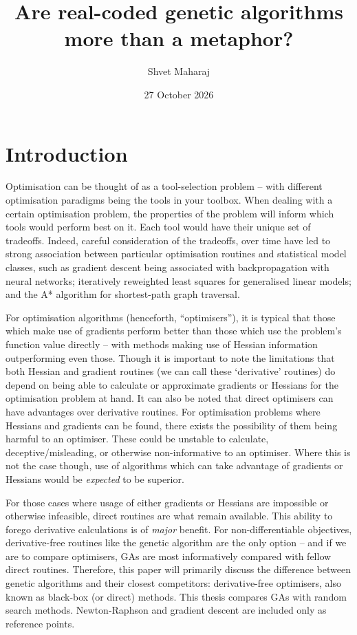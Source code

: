 \documentclass[
  a4paper,
  DIV=11,
  numbers=noendperiod]{scrartcl}
\title{Are real-coded genetic algorithms more than a metaphor?}
\author{Shvet Maharaj}
\date{27 October 2026}
\newcommand{\+}{\phantom{-}}
\renewcommand*\contentsname{Table of contents}
\newcommand\contentsname{Table of contents}
\begin{document}
\maketitle

\renewcommand*\contentsname{Contents}
{
\setcounter{tocdepth}{4}
\tableofcontents
}

\newpage

\section{Introduction}\label{introduction}

Optimisation can be thought of as a tool-selection problem -- with
different optimisation paradigms being the tools in your toolbox. When
dealing with a certain optimisation problem, the properties of the
problem will inform which tools would perform best on it. Each tool
would have their unique set of tradeoffs. Indeed, careful consideration
of the tradeoffs, over time have led to strong association between
particular optimisation routines and statistical model classes, such as
gradient descent being associated with backpropagation with neural
networks; iteratively reweighted least squares for generalised linear
models; and the A* algorithm for shortest-path graph traversal.

For optimisation algorithms (henceforth, ``optimisers''), it is typical
that those which make use of gradients perform better than those which
use the problem's function value directly -- with methods making use of
Hessian information outperforming even those. Though it is important to
note the limitations that both Hessian and gradient routines (we can
call these `derivative' routines) do depend on being able to calculate
or approximate gradients or Hessians for the optimisation problem at
hand. It can also be noted that direct optimisers can have advantages
over derivative routines. For optimisation problems where Hessians and
gradients can be found, there exists the possibility of them being
harmful to an optimiser. These could be unstable to calculate,
deceptive/misleading, or otherwise non-informative to an optimiser.
Where this is not the case though, use of algorithms which can take
advantage of gradients or Hessians would be \emph{expected} to be
superior.

For those cases where usage of either gradients or Hessians are
impossible or otherwise infeasible, direct routines are what remain
available. This ability to forego derivative calculations is of
\emph{major} benefit. For non-differentiable objectives, derivative-free
routines like the genetic algorithm are the only option -- and if we are
to compare optimisers, GAs are most informatively compared with fellow
direct routines. Therefore, this paper will primarily discuss the
difference between genetic algorithms and their closest competitors:
derivative-free optimisers, also known as black-box (or direct) methods.
This thesis compares GAs with random search methods. Newton-Raphson and
gradient descent are included only as reference points.
\end{document}
